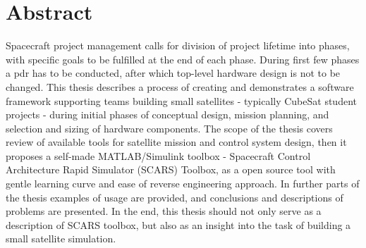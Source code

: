 \section*{Abstract}


Spacecraft project management calls for division of project lifetime into phases, with specific goals to be fulfilled at the end of each phase. During first few phases a \ac*{pdr} has to be conducted, after which top-level hardware design is not to be changed. This thesis describes a process of creating and demonstrates a software framework supporting teams building small satellites - typically CubeSat student projects - during initial phases of conceptual design, mission planning, and selection and sizing of hardware components. The scope of the thesis covers review of available tools for satellite mission and control system design, then it proposes a self-made MATLAB/Simulink toolbox - Spacecraft Control Architecture Rapid Simulator (SCARS) Toolbox, as a open source tool with gentle learning curve and ease of reverse engineering approach. In further parts of the thesis examples of usage are provided, and conclusions and descriptions of problems are presented. In the end, this thesis should not only serve as a description of SCARS toolbox, but also as an insight into the task of building a small satellite simulation.